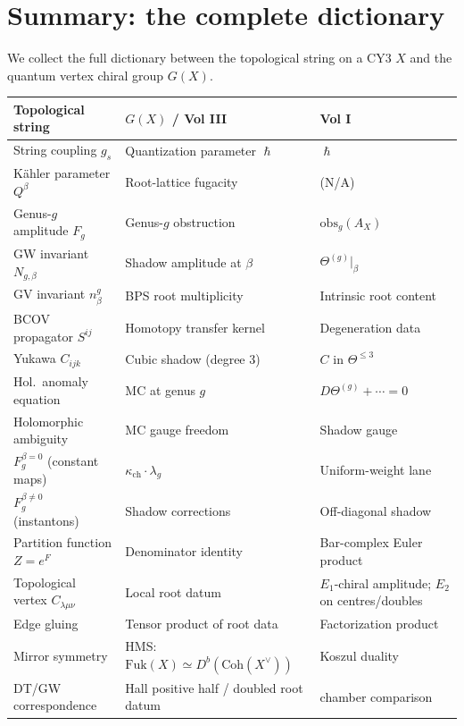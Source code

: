 \documentclass[11pt]{amsart}
\theoremstyle{plain}
\theoremstyle{definition}
\theoremstyle{remark}
\newcommand{\Fuk}{\mathrm{Fuk}}
\newcommand{\Coh}{\mathrm{Coh}}
\renewcommand{\hbar}{\hslash}
\begin{document}
\section{Summary: the complete dictionary}
\label{sec:dictionary}

We collect the full dictionary between the topological string on a CY3 $X$
and the quantum vertex chiral group $G(X)$.

\begin{center}
\renewcommand{\arraystretch}{1.5}
\begin{tabular}{lll}
 \hline
 \textbf{Topological string} & \textbf{$G(X)$ / Vol III} & \textbf{Vol I} \\
 \hline
 String coupling $g_s$ & Quantization parameter $\hbar$ & $\hbar$ \\
 K\"ahler parameter $Q^\beta$ & Root-lattice fugacity & (N/A) \\
 Genus-$g$ amplitude $F_g$ & Genus-$g$ obstruction & $\mathrm{obs}_g(A_X)$ \\
 GW invariant $N_{g,\beta}$ & Shadow amplitude at $\beta$ & $\Theta^{(g)}|_\beta$ \\
 GV invariant $n^g_\beta$ & BPS root multiplicity & Intrinsic root content \\
 BCOV propagator $S^{ij}$ & Homotopy transfer kernel & Degeneration data \\
 Yukawa $C_{ijk}$ & Cubic shadow (degree 3) & $C$ in $\Theta^{\leq 3}$ \\
 Hol.\ anomaly equation & MC at genus $g$ & $D\Theta^{(g)} + \cdots = 0$ \\
 Holomorphic ambiguity & MC gauge freedom & Shadow gauge \\
 $F_g^{\beta=0}$ (constant maps) & $\kappa_{\mathrm{ch}} \cdot \lambda_g$ & Uniform-weight lane \\
 $F_g^{\beta \neq 0}$ (instantons) & Shadow corrections & Off-diagonal shadow \\
 Partition function $Z = e^F$ & Denominator identity & Bar-complex Euler product \\
	 Topological vertex $C_{\lambda\mu\nu}$ & Local root datum & $E_1$-chiral amplitude; $E_2$ on centres/doubles \\
 Edge gluing & Tensor product of root data & Factorization product \\
 Mirror symmetry & HMS: $\Fuk(X) \simeq D^b(\Coh(X^\vee))$ & Koszul duality \\
	 DT/GW correspondence & Hall positive half / doubled root datum & chamber comparison \\
 \hline
\end{tabular}
\end{center}
\end{document}
